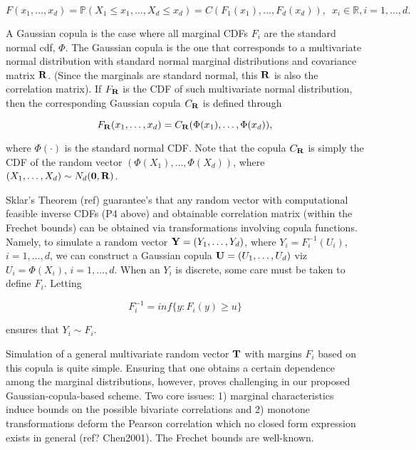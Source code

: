 \documentclass[
]{article}
\begin{document}
\[
F(x_1, \ldots,x_d) = \mathbb P(X_1\leq x_1, \ldots,X_d\leq x_d) = C(F_1(x_1), \ldots, F_d(x_d)), \,\,\, x_i\in \mathbb R, i=1,\ldots,d. 
\]

A Gaussian copula is the case where all marginal CDFs \(F_i\) are the standard normal cdf, \(\Phi\). The Gaussian copula is the one that corresponds to a multivariate normal distribution with standard normal marginal distributions and covariance matrix \({\bf R}\). (Since the marginals are standard normal, this \({\bf R}\) is also the correlation matrix). If \(F_{{\bf R}}\) is the CDF of such multivariate normal distribution, then the corresponding Gaussian copula \(C_{{\bf R}}\) is defined through

\begin{equation}
\label{eq:gauss}
F_{{\bf R}}(x_1, \ldots, x_d) = C_{{\bf R}}(\Phi(x_1), \ldots, \Phi(x_d)),
\end{equation}

where \(\Phi(\cdot)\) is the standard normal CDF. Note that the copula \(C_{{\bf R}}\) is simply the CDF of the random vector \((\Phi(X_1), \ldots, \Phi(X_d))\), where \((X_1, \ldots, X_d) \sim N_d({\bf 0}, {\bf R})\).

Sklar's Theorem (ref) guarantee's that any random vector with computational feasible inverse CDFs (P4 above) and obtainable correlation matrix (within the Frechet bounds) can be obtained via transformations involving copula functions. Namely, to simulate a random vector \({\bf Y} = (Y_1, \ldots, Y_d)\), where \(Y_i=F_i^{-1}(U_i)\), \(i=1, \ldots, d\), we can construct a Gaussian copula \({\bf U} = (U_1, \ldots, U_d)\) viz \(U_i=\Phi(X_i)\), \(i=1, \ldots, d\). When an \(Y_i\) is discrete, some care must be taken to define \(F_i\). Letting

\begin{equation}
F_{i}^{-1} = inf\{y:F_{i}(y) \geq u \}
\label{eq:inverseCDF}
\end{equation}

\noindent ensures that \(Y_i \sim F_i\).

Simulation of a general multivariate random vector \({\bf T}\) with margins \(F_i\) based on this copula is quite simple. Ensuring that one obtains a certain dependence among the marginal distributions, however, proves challenging in our proposed Gaussian-copula-based scheme. Two core issues: 1) marginal characteristics induce bounds on the possible bivariate correlations and 2) monotone transformations deform the Pearson correlation which no closed form expression exists in general (ref? Chen2001). The Frechet bounds are well-known.
\end{document}

